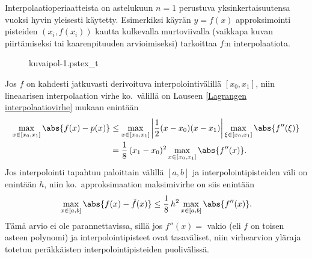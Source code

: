 Interpolaatioperiaatteista on astelukuun $n=1$ perustuva
%
yksinkertaisuutensa vuoksi hyvin yleisesti käytetty. Esimerkiksi käyrän $y=f(x)$ approksimointi
pisteiden $(x_i,f(x_i))$ kautta kulkevalla murtoviivalla (vaikkapa kuvan piirtämiseksi tai
kaarenpituuden arvioimiseksi) tarkoittaa $f$:n 
interpolaatiota.
\begin{figure}[H]
\begin{center}
{kuvaipol-1.pstex_t}
\end{center}
\end{figure}
Jos $f$ on kahdesti jatkuvasti derivoituva interpolointivälillä $[x_0,x_1]$, niin lineaarisen
interpolaation virhe ko.\ välillä on Lauseen \ref{Lagrangen interpolaatiovirhe} mukaan enintään
\begin{align*}
\max_{x\in [x_0,x_1]} \abs{f(x)-p(x)} 
         &\le \max_{x\in[x_0,x_1]} \left|\frac{1}{2}(x-x_0)(x-x_1)\right|
              \max_{\xi\in[x_0,x_1]}\abs{f''(\xi)} \\
         &= \frac{1}{8}\,(x_1-x_0)^2\max_{x\in [x_0,x_1]} \abs{f''(x)}.
\end{align*}
Jos interpolointi tapahtuu paloittain välillä $[a,b]$ ja interpolointipisteiden väli on
enintään $h$, niin ko.\ approksimaation maksimivirhe on siis enintään
\[
\max_{x\in [a,b]} \abs{f(x)-\tilde{f}(x)}\leq\frac{1}{8}\,h^2\max_{x\in [a,b]} \abs{f''(x)}.
\]
Tämä arvio ei ole parannettavissa, sillä jos $f''(x)=$ vakio (eli $f$ on toisen asteen
polynomi) ja interpolointipisteet ovat tasaväliset, niin virhearvion yläraja totetuu
peräkkäisten interpolointipisteiden puolivälissä.


